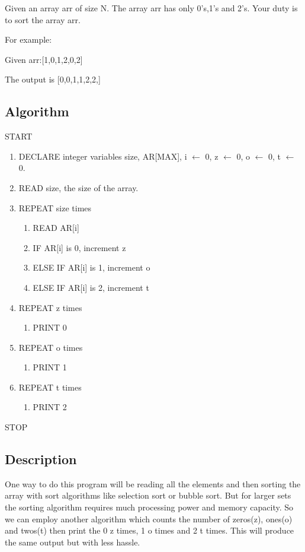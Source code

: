 \documentclass{article}
\begin{document}
Given an array arr of size N. The array arr has only 0's,1's and 2's. Your duty is to sort the array arr.

For example:

Given arr:[1,0,1,2,0,2]

The output is [0,0,1,1,2,2,]
\subsection{Algorithm}
START
\begin{enumerate}
    \item DECLARE integer variables size, AR[MAX], i $\leftarrow$ 0, z $\leftarrow$ 0, o $\leftarrow$ 0, t $\leftarrow$ 0.
    \item READ size, the size of the array.
    \item REPEAT size times 
    \begin{enumerate}
        \item READ AR[i]
        \item IF AR[i] is 0, increment z
        \item ELSE IF AR[i] is 1, increment o
        \item ELSE IF AR[i] is 2, increment t
    \end{enumerate}
    \item REPEAT z times
    \begin{enumerate}
        \item PRINT 0
    \end{enumerate}
    \item REPEAT o times
    \begin{enumerate}
        \item PRINT 1
    \end{enumerate}
    \item REPEAT t times
    \begin{enumerate}
        \item PRINT 2
    \end{enumerate}
\end{enumerate}
STOP
\subsection{Description}
 One way to do this program will be reading all the elements and then sorting the array with sort algorithms like selection sort or bubble sort. But for larger sets the sorting algorithm requires much processing power and memory capacity.\newline
 So we can employ another algorithm which counts the number of zeros(z), ones(o) and twos(t) then print the 0 z times, 1 o times and 2 t times. This will produce the same output but with less hassle.
\end{document}
